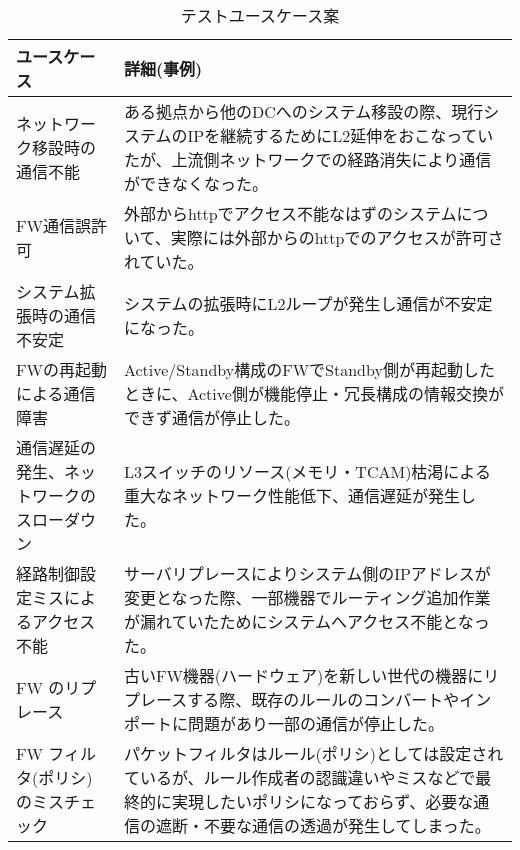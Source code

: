 \begin{table}[h]
 \centering
 \caption{テストユースケース案}
 \label{tab:test-usecases}
 \begin{tabularx}{\linewidth}{p{10em}|X}
  \hline
  ユースケース & 詳細(事例) \\
  \hline
  \hline
  ネットワーク移設時の通信不能 & ある拠点から他のDCへのシステム移設の際、現行システムのIPを継続するためにL2延伸をおこなっていたが、上流側ネットワークでの経路消失により通信ができなくなった。 \\ \hline
  FW通信誤許可 & 外部からhttpでアクセス不能なはずのシステムについて、実際には外部からのhttpでのアクセスが許可されていた。 \\ \hline
  システム拡張時の通信不安定 & システムの拡張時にL2ループが発生し通信が不安定になった。 \\ \hline
  FWの再起動による通信障害 & Active/Standby構成のFWでStandby側が再起動したときに、Active側が機能停止・冗長構成の情報交換ができず通信が停止した。\\ \hline
  通信遅延の発生、ネットワークのスローダウン & L3スイッチのリソース(メモリ・TCAM)枯渇による重大なネットワーク性能低下、通信遅延が発生した。 \\ \hline
  経路制御設定ミスによるアクセス不能 & サーバリプレースによりシステム側のIPアドレスが変更となった際、一部機器でルーティング追加作業が漏れていたためにシステムへアクセス不能となった。 \\ \hline
  FW のリプレース & 古いFW機器(ハードウェア)を新しい世代の機器にリプレースする際、既存のルールのコンバートやインポートに問題があり一部の通信が停止した。 \\ \hline
  FW フィルタ(ポリシ)のミスチェック & パケットフィルタはルール(ポリシ)としては設定されているが、ルール作成者の認識違いやミスなどで最終的に実現したいポリシになっておらず、必要な通信の遮断・不要な通信の透過が発生してしまった。 \\
  \hline
 \end{tabularx}
\end{table}

